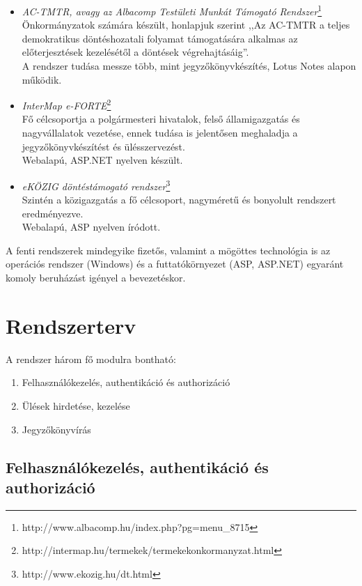 \documentclass[a4paper,12pt,oneside]{report}
\begin{document}
\begin{itemize}

    \item \emph{AC-TMTR, avagy az Albacomp Testületi Munkát Támogató Rendszer}\footnote{http://www.albacomp.hu/index.php?pg=menu\_8715}\\
    Önkormányzatok számára készült, honlapjuk szerint ,,Az AC-TMTR a teljes demokratikus döntéshozatali folyamat támogatására alkalmas az előterjesztések kezelésétől a döntések végrehajtásáig''.\\
    A rendszer tudása messze több, mint jegyzőkönyvkészítés, Lotus Notes alapon működik.
    
    \item \emph{InterMap e-FORTE}\footnote{http://intermap.hu/termekek/termekekonkormanyzat.html}\\
    Fő célcsoportja a polgármesteri hivatalok, felső államigazgatás és nagyvállalatok vezetése, ennek tudása is jelentősen meghaladja a jegyzőkönyvkészítést és ülésszervezést.\\
    Webalapú, ASP.NET nyelven készült.
    
    \item \emph{eKÖZIG döntéstámogató rendszer}\footnote{http://www.ekozig.hu/dt.html}\\
    Szintén a közigazgatás a fő célcsoport, nagyméretű és bonyolult rendszert eredményezve.\\
    Webalapú, ASP nyelven íródott.
    
\end{itemize}

A fenti rendszerek mindegyike fizetős, valamint a mögöttes technológia is \textendash{} az operációs rendszer (Windows) és a futtatókörnyezet (ASP, ASP.NET) egyaránt komoly beruházást igényel a bevezetéskor.

\section{Rendszerterv}

A rendszer három fő modulra bontható:

\begin{enumerate}
    \item Felhasználókezelés, authentikáció és authorizáció
    \item Ülések hirdetése, kezelése
    \item Jegyzőkönyvírás
\end{enumerate}

\subsection{Felhasználókezelés, authentikáció és authorizáció}
\end{document}
